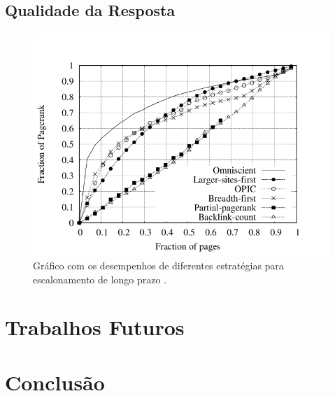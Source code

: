 \documentclass[a4paper,12pt,titlepage]{article}
\begin{document}
\subsection{Qualidade da Resposta}

\begin{figure}[H]
     \centering
     \includegraphics[scale=0.45]{figures/performance.png}
     \caption{Gráfico com os desempenhos de diferentes estratégias para escalonamento de longo prazo  \cite{carlos}.}
     \label{bsp}
\end{figure}


\section{Trabalhos Futuros}

\section{Conclusão}


\newpage
\end{document}
